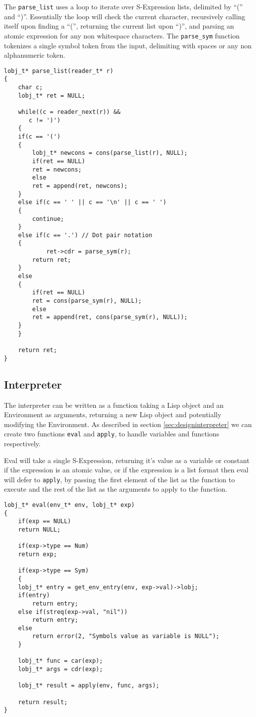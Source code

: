 \documentclass[10pt]{report}
\begin{document}
The \texttt{parse_list} uses a loop to iterate over S-Expression lists, delimited by ``('' and ``)''. Essentially the loop will check the current character, recursively calling itself upon finding a ``('', returning the current list upon ``)'', and parsing an atomic expression for any non whitespace characters. The \texttt{parse_sym} function tokenizes a single symbol token from the input, delimiting with spaces or any non alphanumeric token. 

\begin{lstlisting}
lobj_t* parse_list(reader_t* r)
{
    char c;
    lobj_t* ret = NULL;
    
    while((c = reader_next(r)) &&
	   c != ')')
    {
	if(c == '(')
	{
	    lobj_t* newcons = cons(parse_list(r), NULL);
	    if(ret == NULL)
		ret = newcons;
	    else
		ret = append(ret, newcons);
	}
	else if(c == ' ' || c == '\n' || c == ' ')
	{
	    continue;
	}
	else if(c == '.') // Dot pair notation
	{
            ret->cdr = parse_sym(r);
	    return ret;
	}
	else
	{
	    if(ret == NULL)
		ret = cons(parse_sym(r), NULL);
	    else
		ret = append(ret, cons(parse_sym(r), NULL));
	}
    }

    return ret;
}
\end{lstlisting}

\subsection{Interpreter} \label{sec:interpreter}
The interpreter can be written as a function taking a Lisp object and an Environment as arguments, returning a new Lisp object and potentially modifying the Environment. As described in section \ref{sec:designinterpreter} we can create two functions \texttt{eval} and \texttt{apply}, to handle variables and functions respectively.

Eval will take a single S-Expression, returning it's value as a variable or constant if the expression is an atomic value, or if the expression is a list format then eval will defer to \texttt{apply}, by passing the first element of the list as the function to execute and the rest of the list as the arguments to apply to the function.

\begin{lstlisting}
lobj_t* eval(env_t* env, lobj_t* exp)
{
    if(exp == NULL)
	return NULL;

    if(exp->type == Num)
	return exp;

    if(exp->type == Sym)
    {
	lobj_t* entry = get_env_entry(env, exp->val)->lobj;
	if(entry)
	    return entry;
	else if(streq(exp->val, "nil"))
	    return entry;
	else
	    return error(2, "Symbols value as variable is NULL");
    }

    lobj_t* func = car(exp);
    lobj_t* args = cdr(exp);

    lobj_t* result = apply(env, func, args);

    return result;
}
\end{lstlisting}
\end{document}
